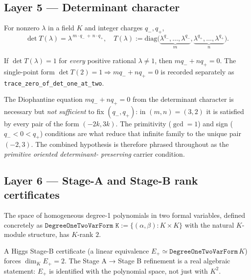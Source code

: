 \documentclass[11pt,a4paper]{article}
\begin{document}
\subsection*{Layer 5 --- Determinant character}

\begin{theorem}
For nonzero $\lambda$ in a field $K$ and integer charges $q_-, q_+$,
\[
\det T(\lambda)
= \lambda^{\,m \cdot q_- \,+\, n \cdot q_+},
\quad
T(\lambda) :=
\mathrm{diag}\bigl(
\underbrace{\lambda^{q_-},\ldots,\lambda^{q_-}}_{m},
\underbrace{\lambda^{q_+},\ldots,\lambda^{q_+}}_{n}
\bigr).
\]
\end{theorem}

\begin{corollary}
If $\det T(\lambda) = 1$ for \emph{every} positive rational
$\lambda \neq 1$, then $m q_- + n q_+ = 0$. The single-point form
$\det T(2) = 1 \Rightarrow m q_- + n q_+ = 0$ is recorded
separately as \texttt{trace\_zero\_of\_det\_one\_at\_two}.
\end{corollary}

\begin{remark}
The Diophantine equation $m q_- + n q_+ = 0$ from the determinant
character is necessary but \emph{not sufficient} to fix $(q_-,
q_+)$: in $(m,n)=(3,2)$ it is satisfied by every pair of the form
$(-2 k, 3 k)$. The primitivity ($\gcd = 1$) and sign ($q_- <
0 < q_+$) conditions are what reduce that infinite family to the
unique pair $(-2, 3)$. The combined hypothesis is therefore
phrased throughout as the \emph{primitive oriented determinant-
preserving} carrier condition.
\end{remark}

\subsection*{Layer 6 --- Stage-A and Stage-B rank certificates}

\begin{theorem}
The space of homogeneous degree-1 polynomials in two formal
variables, defined concretely as
$\texttt{DegreeOneTwoVarForm K} := \{(\alpha, \beta) : K \times K\}$
with the natural $K$-module structure, has $K$-rank $2$.
\end{theorem}

\begin{theorem}
A Higgs Stage-B certificate (a linear equivalence
$E_+ \simeq \texttt{DegreeOneTwoVarForm}\,K$) forces
$\dim_K E_+ = 2$. The Stage A → Stage B refinement is a real
algebraic statement: $E_+$ is identified with the polynomial
space, not just with $K^2$.
\end{theorem}
\end{document}
